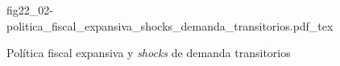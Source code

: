 \begin{figure}[h]
\centering
\def\svgwidth{0.5\textwidth}
{fig22_02-politica_fiscal_expansiva_shocks_demanda_transitorios.pdf_tex}
\caption{Política fiscal expansiva y \textit{shocks} de demanda transitorios}
\label{fig22_02-politica_fiscal_expansiva_shocks_demanda_transitorios}
\end{figure}